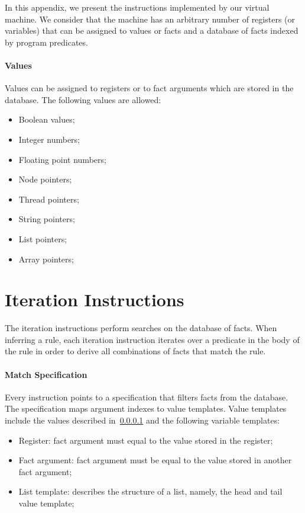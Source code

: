 In this appendix, we present the instructions implemented by our virtual
machine. We consider that the machine has an arbitrary number of registers (or
variables) that can be assigned to values or facts and a database of facts
indexed by program predicates.

\paragraph{Values}\label{appendix:vm:values} Values can be assigned to registers or to fact arguments
which are stored in the database. The following values are allowed:

\begin{itemize}
      \item Boolean values;
      \item Integer numbers;
      \item Floating point numbers;
      \item Node pointers;
      \item Thread pointers;
      \item String pointers;
      \item List pointers;
      \item Array pointers;
\end{itemize}

\section{Iteration Instructions}

The iteration instructions perform searches on the database of facts. When
inferring a rule, each iteration instruction iterates over a predicate in the
body of the rule in order to derive all combinations of facts that match the
rule.

\paragraph{Match Specification} Every instruction points to a 
specification that
filters facts from the database. The specification maps argument indexes to value
templates. Value templates include the values described
in~\ref{appendix:vm:values} and the following variable templates:

\begin{itemize}
      \item Register: fact argument must equal to the value stored in the
         register;
      \item Fact argument: fact argument must be equal to the value stored in
         another fact argument;
      \item List template: describes the structure of a list, namely, the head
         and tail value template;
\end{itemize}

